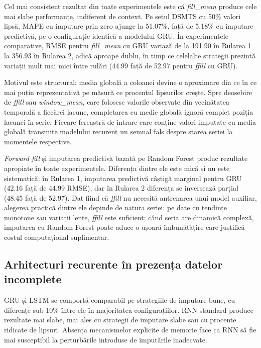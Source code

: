 Cel mai consistent rezultat din toate experimentele este că \textit{fill\_mean} produce cele mai slabe performanțe, indiferent de context. Pe setul DSMTS cu 50\% valori lipsă, MAPE cu imputare prin zero ajunge la 51.07\%, față de 5.18\% cu imputare predictivă, pe o configurație identică a modelului GRU. În experimentele comparative, RMSE pentru \textit{fill\_mean} cu GRU variază de la 191.90 în Rularea 1 la 356.93 în Rularea 2, adică aproape dublu, în timp ce celelalte strategii prezintă variații mult mai mici între rulări (44.99 față de 52.97 pentru \textit{ffill} cu GRU).

Motivul este structural: media globală a coloanei devine o aproximare din ce în ce mai puțin reprezentativă pe măsură ce procentul lipsurilor crește. Spre deosebire de \textit{ffill} sau \textit{window\_mean}, care folosesc valorile observate din vecinătatea temporală a fiecărei lacune, completarea cu medie globală ignoră complet poziția lacunei în serie. Fiecare fereastră de intrare care conține valori imputate cu media globală transmite modelului recurent un semnal fals despre starea seriei la momentele respective.

\textit{Forward fill} și imputarea predictivă bazată pe Random Forest produc rezultate apropiate în toate experimentele. Diferența dintre ele este mică și nu este sistematică: în Rularea 1, imputarea predictivă câștigă marginal pentru GRU (42.16 față de 44.99 RMSE), dar în Rularea 2 diferența se inversează parțial (48.45 față de 52.97). Dat fiind că \textit{ffill} nu necesită antrenarea unui model auxiliar, alegerea practică dintre ele depinde de natura seriei: pe date cu tendințe monotone sau variații lente, \textit{ffill} este suficient; când seria are dinamică complexă, imputarea cu Random Forest poate aduce o ușoară îmbunătățire care justifică costul computațional suplimentar.

\subsection{Arhitecturi recurente în prezența datelor incomplete}

GRU și LSTM se comportă comparabil pe strategiile de imputare bune, cu diferențe sub 10\% între ele în majoritatea configurațiilor. RNN standard produce rezultate mai slabe, mai ales cu strategii de imputare slabe sau cu procente ridicate de lipsuri. Absența mecanismelor explicite de memorie face ca RNN să fie mai susceptibil la perturbările introduse de imputările inadecvate.

